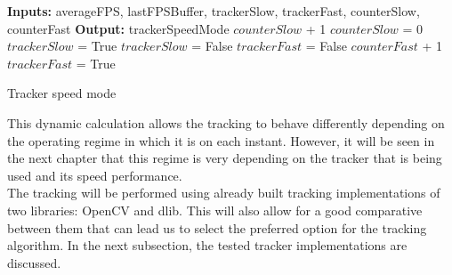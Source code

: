 \begin{algorithmic}[H]
\begin{algorithm}
\State \textbf{Inputs:} averageFPS, lastFPSBuffer, trackerSlow, trackerFast, counterSlow, counterFast
\State \textbf{Output:} trackerSpeedMode
    \State $counterSlow$ + 1
        \State $counterSlow$ = 0
        \State $trackerSlow$ = True
    \EndIf
{}
    \State $trackerSlow$ = False
    \State $trackerFast$ = False
    \State $counterFast$ + 1
\State $trackerFast$ = True
\EndIf  
\EndProcedure
\caption{Tracker speed mode}\label{tracker_speed}
\end{algorithm}
\end{algorithmic}

This dynamic calculation allows the tracking to behave differently depending on the operating regime in which it is on each instant. However, it will be seen in the next chapter that this regime is very depending on the tracker that is being used and its speed performance.\\
The tracking will be performed using already built tracking implementations of two libraries: OpenCV and dlib. This will also allow for a good comparative between them that can lead us to select the preferred option for the tracking algorithm. In the next subsection, the tested tracker implementations are discussed.
